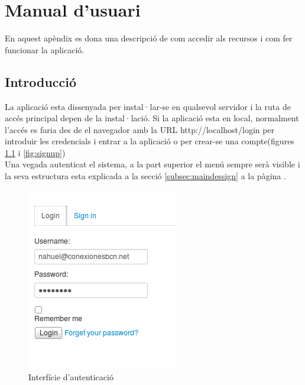 \chapter{Manual d'usuari}
\label{cha:userguide}
En aquest apèndix es dona una descripció de com accedir als recursos i com fer funcionar la aplicació.

\section{Introducció}
La aplicació esta dissenyada per instal·lar-se en qualsevol servidor i la ruta de accés principal depen de la instal·lació.
Si la aplicació esta en local, normalment l'accés es faria des de el navegador amb la URL http://localhost/login per introduir les credencials i entrar a la aplicació o per crear-se una compte(figures \ref{fig:login} i \ref{fig:signup}) \\

Una vegada autenticat el sistema, a la part superior el menú sempre serà visible i la seva estructura esta explicada a la secció \ref{subsec:maindessign} a la p\`{a}gina \pageref{menudessign}.\\

\begin{figure}[h!]
  \centering
  \includegraphics[scale=0.4]{img/userguide/login.png}
  \caption{Interfície d'autenticació}
  \label{fig:login}
\end{figure}

